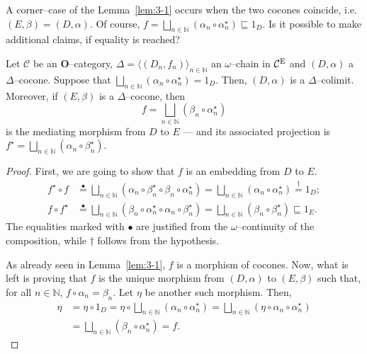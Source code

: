 A corner--case of the Lemma~\ref{lem:3-1} occurs when the two cocones coincide, i.e. \((E,\beta) = (D,\alpha)\). %
Of course, \(f = \bigsqcup_{n \in \mathbb{N}}(\alpha_n \circ \alpha_n^\star) \sqsubseteq 1_D\).
Is it possible to make additional claims, if equality is reached?

\begin{thm}\label{thm:3-1}
  Let \(\mathcal{C}\) be an \(\mathbf{O}\)--category, \(\Delta = {\langle (D_n,f_n) \rangle}_{n \in \mathbb{N}}\) an \(\omega\)--chain in %
  \(\mathcal{C}^\textup{E}\) and \((D,\alpha)\) a \(\Delta\)--cocone. %
  Suppose that \(\bigsqcup_{n \in \mathbb{N}}(\alpha_n \circ \alpha_n^\star) = 1_D\).
  Then, \((D,\alpha)\) is a \(\Delta\)--colimit. %
  Moreover, if \((E,\beta)\) is a \(\Delta\)--cocone, then %
  \begin{equation*}
    f = \bigsqcup_{n \in \mathbb{N}}(\beta_n \circ \alpha_n^\star)
  \end{equation*}
  is the mediating morphism from \(D\) to \(E\) --- and its associated projection is \(f^\star = \bigsqcup_{n \in \mathbb{N}}(\alpha_n \circ \beta_n^\star)\).
\end{thm}
\begin{proof}
  First, we are going to show that \(f\) is an embedding from \(D\) to \(E\).
  \begin{align*}
    f^\star \circ f &\overset{\bullet}{=}
    \bigsqcup_{n \in \mathbb{N}}(\alpha_n \circ \beta_n^\star \circ \beta_n \circ \alpha_n^\star) =
    \bigsqcup_{n \in \mathbb{N}}(\alpha_n \circ \alpha_n^\star) \overset{\dagger}{=} 1_D; \\
    f \circ f^\star &\overset{\bullet}{=}
    \bigsqcup_{n \in \mathbb{N}}(\beta_n \circ \alpha_n^\star \circ \alpha_n \circ \beta_n^\star) =
    \bigsqcup_{n \in \mathbb{N}}(\beta_n \circ \beta_n^\star)
    \sqsubseteq 1_E.
  \end{align*}
  The equalities marked with \(\bullet\) are justified from the \(\omega\)--continuity of the composition, while \(\dagger\) follows from the hypothesis. %

  As already seen in Lemma~\ref{lem:3-1}, \(f\) is a morphism of cocones.
  Now, what is left is proving that \(f\) is the unique morphism from \((D,\alpha)\) to \((E,\beta)\) such that, for all \(n \in \mathbb{N}\), \(f \circ \alpha_n = \beta_n\).
  Let \(\eta\) be another such morphism. Then, %
  \begin{equation*}
    \begin{split}
      \eta &= \eta \circ 1_D
      = \eta \circ \bigsqcup_{n \in \mathbb{N}}(\alpha_n \circ \alpha_n^\star) = \bigsqcup_{n \in \mathbb{N}}(\eta \circ \alpha_n \circ \alpha_n^\star) \\
      &= \bigsqcup_{n \in \mathbb{N}}(\beta_n \circ \alpha_n^\star)
      = f.
    \end{split}
  \end{equation*} \qedhere
\end{proof}


